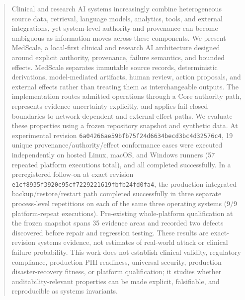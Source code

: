 \begin{abstract}
Clinical and research AI systems increasingly combine heterogeneous source data, retrieval, language models, analytics, tools, and external integrations, yet system-level authority and provenance can become ambiguous as information moves across these components. We present MedScale, a local-first clinical and research AI architecture designed around explicit authority, provenance, failure semantics, and bounded effects. MedScale separates immutable source records, deterministic derivations, model-mediated artifacts, human review, action proposals, and external effects rather than treating them as interchangeable outputs. The implementation routes admitted operations through a Core authority path, represents evidence uncertainty explicitly, and applies fail-closed boundaries to network-dependent and external-effect paths. We evaluate these properties using a frozen repository snapshot and synthetic data. At experimental revision \texttt{6a04266ae59bfb75f24d6634becd3bc4d32576c4}, 19 unique provenance/authority/effect conformance cases were executed independently on hosted Linux, macOS, and Windows runners (57 repeated platform executions total), and all completed successfully. In a preregistered follow-on at exact revision \texttt{e1cf8935f3920c95cf7229221619fbfb24fd0fa4}, the production integrated backup/restore/restart path completed successfully in three separate process-level repetitions on each of the same three operating systems (9/9 platform-repeat executions). Pre-existing whole-platform qualification at the frozen snapshot spans 35 evidence areas and recorded two defects discovered before repair and regression testing. These results are exact-revision systems evidence, not estimates of real-world attack or clinical failure probability. This work does not establish clinical validity, regulatory compliance, production PHI readiness, universal security, production disaster-recovery fitness, or platform qualification; it studies whether auditability-relevant properties can be made explicit, falsifiable, and reproducible as systems invariants.
\end{abstract}

